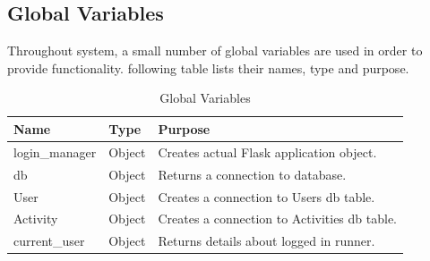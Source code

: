 \documentclass{article}[12pt,a4paper]
\begin{document}
\subsection{Global Variables}
Throughout system, a small number of global variables are used in order to provide functionality. following table lists their names, type and purpose.
\begin{table}[h]
\begin{tabular}{|l|l|l|}
\hline
\textbf{Name} & \textbf{Type} & \textbf{Purpose}                        \\ \hline
login\_manager                    & Object                 & Creates actual Flask application object.     \\ \hline
db                     & Object                 & Returns a connection to database.            \\ \hline
User                   & Object                 & Creates a connection to Users db table.      \\ \hline
Activity               & Object                 & Creates a connection to Activities db table. \\ \hline
current\_user          & Object                 & Returns details about logged in runner.        \\ \hline
\end{tabular}
\caption{Global Variables}
\end{table}
\end{document}
